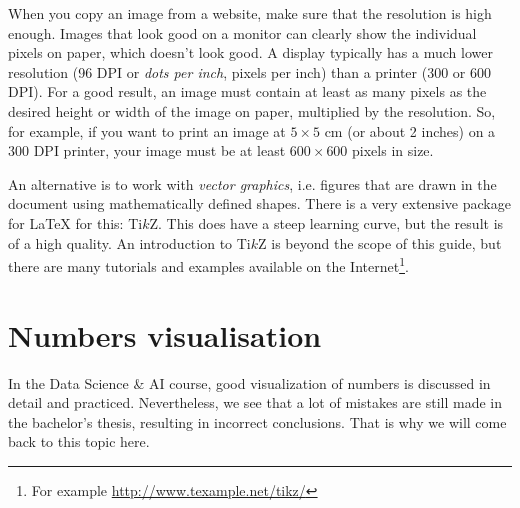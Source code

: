 When you copy an image from a website, make sure that the resolution is high enough. Images that look good on a monitor can clearly show the individual pixels on paper, which doesn't look good. A display typically has a much lower resolution (96 DPI or \emph{dots per inch}, pixels per inch) than a printer (300 or 600 DPI). For a good result, an image must contain at least as many pixels as the desired height or width of the image on paper, multiplied by the resolution. So, for example, if you want to print an image at $5 \times 5$ cm (or about 2 inches) on a 300 DPI printer, your image must be at least $600 \times 600$ pixels in size.

An alternative is to work with \emph{vector graphics}, i.e. figures that are drawn in the document using mathematically defined shapes. There is a very extensive package for {\LaTeX} for this: Ti$k$Z. This does have a steep learning curve, but the result is of a high quality. An introduction to Ti$k$Z is beyond the scope of this guide, but there are many tutorials and examples available on the Internet\footnote{For example \url{http://www.texample.net/tikz/}}.

%

%
%
%


\section{Numbers visualisation }
\label{sec:numbersvisualisation}

In the Data Science \& AI course, good visualization of numbers is discussed in detail and practiced. Nevertheless, we see that a lot of mistakes are still made in the bachelor's thesis, resulting in incorrect conclusions. That is why we will come back to this topic here.

